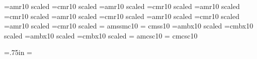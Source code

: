\ifamrfonts \font\brm=amr10 scaled  
      \else \font\brm=cmr10 scaled  \fi 
\ifamrfonts \font\halfrm=amr10 scaled \magstephalf 
      \else \font\halfrm=cmr10 scaled \magstephalf \fi 
\ifamrfonts \font\bbrm=amr10 scaled  
      \else \font\bbrm=cmr10 scaled  \fi 
\ifamrfonts \font\bbbrm=amr10 scaled  
      \else \font\bbbrm=cmr10 scaled  \fi 
\ifamrfonts \font\bbbbrm=amr10 scaled  
      \else\font \bbbbrm=cmr10 scaled  \fi 
\ifamrfonts \font\bbbbbrm=amr10 scaled  
      \else \font\bbbbbrm=cmr10 scaled  \fi 
\ifamrfonts \font\sf = amssmc10 
      \else \font\sf = cmss10 \fi 
\ifamrfonts \font\chapfont=ambx10 scaled  
      \else \font\chapfont=cmbx10 scaled  \fi 
\ifamrfonts \font\secfont=ambx10 scaled  
      \else \font\secfont=cmbx10 scaled  \fi 
\ifamrfonts \font\sc= amcsc10 
      \else \font\sc= cmcsc10 \fi 
 
 
\raggedbottom      %
\hsize=5.5in 
\vsize=7in 
\voffset=.75in 
\parskip=\baselineskip 
{}   %
 
\newif \ifcanspell 
\canspelltrue      %
 
\def\aesthetic{\ifcanspell \ae{}sthetic\else esthetic\fi} 
\def\analogue{\ifcanspell analogue\else analog\fi} 
     \let\analog=\analogue 
\def\cancelled{\ifcanspell cancelled\else canceled\fi} 
     \let\canceled=\cancelled 
\def\centimetre{\ifcanspell centimetre\else centimeter\fi} 
     \let\centimeter=\centimetre 
\def\centre{\ifcanspell centre\else center\fi} 
     \let\center=\centre 
\def\centred{\ifcanspell centred\else centered\fi} 
     \let\centered=\centred 
\def\our{\ifcanspell our\else or\fi} 
\def\postcode{\ifcanspell postalcode\else zipcode\fi} 
\def\province{\ifcanspell province\else state\fi} 
\def\theatre{\ifcanspell theatre\else theater\fi} 
     \let\theater=\theatre 
 
 
\def\gentleheadline{%
    \vbox {\hrule%
        \line {\strut \vrule \quad \tenrm A \TeX{} intro 
              \ifcanspell (Canadian \else (U.S. \fi spelling) 
              \hfil 
              \ifnum \secnum > 0 Section \the\secnum: \fi \sectiontitle \quad 
              \vrule}%
        \hrule}%
} 
 
